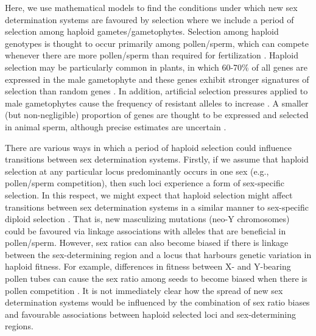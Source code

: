 \documentclass[12pt]{article}
\begin{document}

Here, we use mathematical models to find the conditions under which new sex determination systems are favoured by selection where we include a period of selection among haploid gametes/gametophytes. 
Selection among haploid genotypes is thought to occur primarily among pollen/sperm, which can compete whenever there are more pollen/sperm than required for fertilization \citep{Mulcahy:1996ha,JOSEPH:2004haa}. 
Haploid selection may be particularly common in plants, in which 60-70\% of all genes are expressed in the male gametophyte and these genes exhibit stronger signatures of selection than random genes \citep{Borg:2009jpa,Arunkumar:2013iq,Gossmann:2014dua}.
In addition, artificial selection pressures applied to male gametophytes cause the frequency of resistant alleles to increase \citep[e.g.,][]{Hormaza:1996cv,Ravikumar:2003uo,Hedhly:2004iv,Clarke:2004ir}. 
A smaller (but non-negligible) proportion of genes are thought to be expressed and selected in animal sperm, although precise estimates are uncertain \citep{Zheng:2001fi,JOSEPH:2004haa,Vibranovski:2010et}. 

There are various ways in which a period of haploid selection could influence transitions between sex determination systems. 
Firstly, if we assume that haploid selection at any particular locus predominantly occurs in one sex (e.g., pollen/sperm competition), then such loci experience a form of sex-specific selection. 
In this respect, we might expect that haploid selection might affect transitions between sex determination systems in a similar manner to sex-specific diploid selection \citep[as explored by][]{vanDoorn:2007eu,vanDoorn:2010hu}. 
That is, new masculizing mutations (neo-Y chromosomes) could be favoured via linkage associations with alleles that are beneficial in pollen/sperm. 
However, sex ratios can also become biased if there is linkage between the sex-determining region and a locus that harbours genetic variation in haploid fitness. 
For example, differences in fitness between X- and Y-bearing pollen tubes can cause the sex ratio among seeds to become biased when there is pollen competition \citep{Lloyd:1974tz,Conn:1981uw,Stehlik:2005ul,Stehlik:2006to,Field:2012fd,Field:2013cc}.
It is not immediately clear how the spread of new sex determination systems would be influenced by the combination of sex ratio biases and favourable associations between haploid selected loci and sex-determining regions. 
\end{document}
